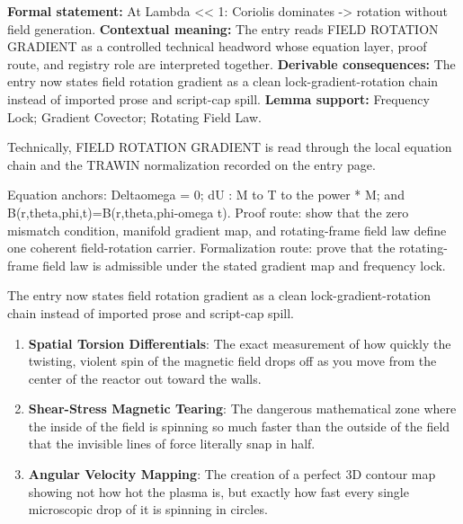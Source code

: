 \begingroup\footnotesize\setlength{\emergencystretch}{3em}\sloppy
\textbf{Formal statement:} At Lambda << 1: Coriolis dominates -> rotation without field generation. \textbf{Contextual meaning:} The entry reads FIELD ROTATION GRADIENT as a controlled technical headword whose equation layer, proof route, and registry role are interpreted together. \textbf{Derivable consequences:} The entry now states field rotation gradient as a clean lock-gradient-rotation chain instead of imported prose and script-cap spill. \textbf{Lemma support:} Frequency Lock; Gradient Covector; Rotating Field Law.\par
\endgroup

Technically, FIELD ROTATION GRADIENT is read through the local equation chain and the TRAWIN normalization recorded on the entry page.

Equation anchors: Deltaomega = 0; dU : M to T to the power * M; and B(r,theta,phi,t)=B(r,theta,phi-omega t). Proof route: show that the zero mismatch condition, manifold gradient map, and rotating-frame field law define one coherent field-rotation carrier. Formalization route: prove that the rotating-frame field law is admissible under the stated gradient map and frequency lock.

The entry now states field rotation gradient as a clean lock-gradient-rotation chain instead of imported prose and script-cap spill.
\endgroup

\begin{enumerate}[leftmargin=1.6em,itemsep=6pt,topsep=4pt]
\item \textbf{Spatial Torsion Differentials}: The exact measurement of how quickly the twisting, violent spin of the magnetic field drops off as you move from the center of the reactor out toward the walls.
\item \textbf{Shear-Stress Magnetic Tearing}: The dangerous mathematical zone where the inside of the field is spinning so much faster than the outside of the field that the invisible lines of force literally snap in half.
\item \textbf{Angular Velocity Mapping}: The creation of a perfect 3D contour map showing not how hot the plasma is, but exactly how fast every single microscopic drop of it is spinning in circles.
\end{enumerate}

